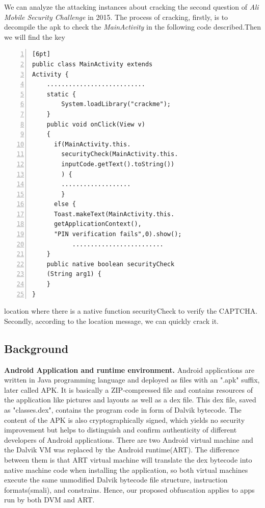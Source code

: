 We can analyze the attacking instances about cracking the second question of \emph{Ali Mobile Security Challenge} in 2015. The process of cracking, firstly, is to decompile the apk to check the \emph{MainActivity} in the following code described.Then we will find the key \\


\begin{lstlisting}[language={[ANSI]C}, backgroundcolor=\color{backcolour},
numbers=left,numberstyle=\tiny,keywordstyle=\color{blue},commentstyle=\color{red!50!green!50!blue!50}][6pt]
public class MainActivity extends
Activity {
    ...........................
    static {
        System.loadLibrary("crackme");
    }
    public void onClick(View v)
    {
      if(MainActivity.this.
        securityCheck(MainActivity.this.
        inputCode.getText().toString())
        ) {
        ...................
        }
      else {
      Toast.makeText(MainActivity.this.
      getApplicationContext(),
      "PIN verification fails",0).show();
           .........................
    }
    public native boolean securityCheck
    (String arg1) {
    }
}

\end{lstlisting}
\noindent  location where there is a native function securityCheck to verify the CAPTCHA. Secondly, according to the location message, we can quickly crack it.


\subsection{Background}
\textbf{Android Application and runtime environment.} Android applications are written in Java programming language and deployed as files with an ".apk" suffix, later called APK. It is basically a ZIP-compressed file and contains resources of the application like pictures and layouts as well as a dex file. This dex file, saved as "classes.dex", contains the program code in form of Dalvik bytecode. The content of the APK is also cryptographically signed, which yields no security improvement but helps to distinguish and confirm authenticity of different developers of Android applications. There are two Android virtual machine and the Dalvik VM was replaced by the Android runtime(ART). The difference between them is that ART virtual machine will translate the dex bytecode into native machine code when installing the application, so both virtual machines execute the same unmodified Dalvik bytecode file structure, instruction formats(smali), and constrains. Hence, our proposed obfuscation applies to apps run by both DVM and ART.

